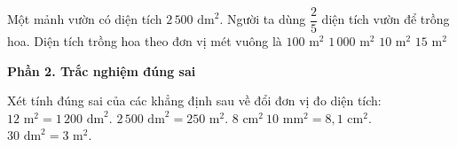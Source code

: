 \begin{ex} %
Một mảnh vườn có diện tích $2\,500\text{ dm}^2$. Người ta dùng $\dfrac{2}{5}$ diện tích vườn để trồng hoa. Diện tích trồng hoa theo đơn vị mét vuông là
\choice
{$100\text{ m}^2$}
{$1\,000\text{ m}^2$}
{\True $10\text{ m}^2$}
{$15\text{ m}^2$}
\end{ex}

\textbf{Phần 2. Trắc nghiệm đúng sai}

\begin{ex} %
Xét tính đúng sai của các khẳng định sau về đổi đơn vị đo diện tích:
\choiceTF
{\True $12\text{ m}^2 = 1\,200\text{ dm}^2$.}
{$2\,500\text{ dm}^2 = 250\text{ m}^2$.}
{\True $8\text{ cm}^2\ 10\text{ mm}^2 = 8{,}1\text{ cm}^2$.}
{$30\text{ dm}^2 = 3\text{ m}^2$.}
\end{ex}

